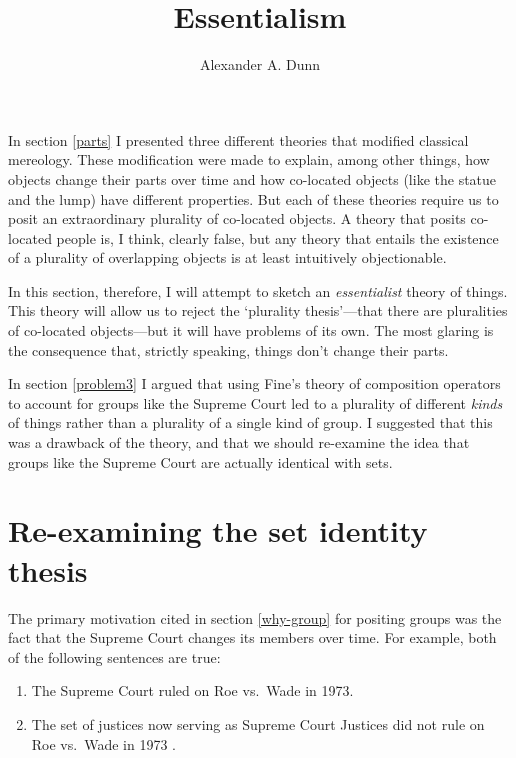 \documentclass[11pt]{article}
\title{Essentialism}
\author{Alexander A. Dunn}
\begin{document}
\ifstandalone
\maketitle
\begin{spacing}{1.5}
\fi

\label{essential}

In section \ref{parts} I presented three different theories that
modified classical mereology.  These modification were made to
explain, among other things, how objects change their parts over time
and how co-located objects (like the statue and the lump) have
different properties.  But each of these theories require us to posit
an extraordinary plurality of co-located objects.  A theory that posits
co-located people is, I think, clearly false, but any theory that
entails the existence of a plurality of overlapping objects is at
least intuitively objectionable.

In this section, therefore, I will attempt to sketch an {\em
  essentialist} theory of things.  This theory will allow us to reject
the `plurality thesis'---that there are pluralities of co-located
objects---but it will have problems of its own.  The most glaring is
the consequence that, strictly speaking, things don't change their
parts.

In section \ref{problem3} I argued that using Fine's theory of
composition operators to account for groups like the Supreme Court led
to a plurality of different {\em kinds} of things rather than a
plurality of a single kind of group.  I suggested that this was a
drawback of the theory, and that we should re-examine the idea that
groups like the Supreme Court are actually identical with sets.

\section{Re-examining the set identity thesis}
\label{set-id}
The primary motivation cited in section \ref{why-group} for positing
groups was the fact that the Supreme Court changes its members over
time.  For example, both of the following sentences are true:

\begin{enumerate}[label=(\arabic*)]
  \item The Supreme Court ruled on Roe vs.\ Wade in 1973. \label{roe1}

  \item The set of justices now serving as Supreme Court Justices did
    not rule on Roe vs.\ Wade in 1973
    \citep[135]{uzquiano2004a}. \label{roe2}
\end{enumerate}


\end{spacing}
\end{document}
